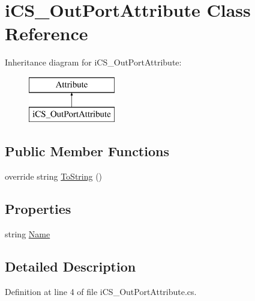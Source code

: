 \hypertarget{classi_c_s___out_port_attribute}{\section{i\+C\+S\+\_\+\+Out\+Port\+Attribute Class Reference}
\label{classi_c_s___out_port_attribute}
}
Inheritance diagram for i\+C\+S\+\_\+\+Out\+Port\+Attribute\+:\begin{figure}[H]
\begin{center}
\leavevmode
\includegraphics[height=2.000000cm]{classi_c_s___out_port_attribute}
\end{center}
\end{figure}
\subsection*{Public Member Functions}
\begin{DoxyCompactItemize}
\item 
override string \hyperlink{classi_c_s___out_port_attribute_a0b8023cde6d7134c7b9824d2fa194cb9}{To\+String} ()
\end{DoxyCompactItemize}
\subsection*{Properties}
\begin{DoxyCompactItemize}
\item 
string \hyperlink{classi_c_s___out_port_attribute_abc3ecc86bfba191312e69d7547bbb344}{Name}
\end{DoxyCompactItemize}


\subsection{Detailed Description}


Definition at line 4 of file i\+C\+S\+\_\+\+Out\+Port\+Attribute.\+cs.



